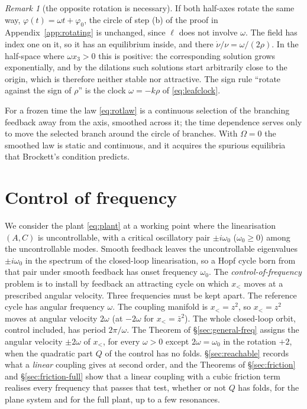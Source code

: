 \documentclass[11pt,reqno]{amsart}
\theoremstyle{plain}
\theoremstyle{definition}
\theoremstyle{remark}
\newtheorem*{remark}{Remark}
\begin{document}
\begin{remark}[the opposite rotation is necessary]
If both half-axes rotate the same way, $\varphi(t)=\omega t+\varphi_0$, the circle of step (b) of the proof in Appendix~\ref{app:rotating} is unchanged, since
$\ell$ does not involve $\omega$. The field has index one on it, so it has an equilibrium inside, and there
$\dot\nu/\nu=\omega/(2\rho)$. In the half-space where $\omega x_3>0$ this is positive: the corresponding solution
grows exponentially, and by the dilations such solutions start arbitrarily close to the origin, which is
therefore neither stable nor attractive. The sign rule ``rotate against the sign of $\rho$'' is the clock
$\omega=-k\rho$ of \eqref{eq:leafclock}.
\end{remark}
For a frozen time the law \eqref{eq:rotlaw} is a continuous selection of the branching feedback away from the
axis, smoothed across it; the time dependence serves only to move the selected branch around the circle of
branches. With $\Omega=0$ the smoothed law is static and continuous, and it acquires the spurious equilibria
that Brockett's condition predicts.


\section{Control of frequency}\label{sec:frequency}

We consider the plant \eqref{eq:plant} at a working point where the linearisation $(A,C)$ is
uncontrollable, with a critical oscillatory pair $\pm i\omega_0$ ($\omega_0\ge0$) among the
uncontrollable modes. Smooth feedback leaves the uncontrollable eigenvalues $\pm i\omega_0$ in the
spectrum of the closed-loop linearisation, so a Hopf cycle born from that pair under smooth
feedback has onset frequency $\omega_0$. The \emph{control-of-frequency} problem is to install by
feedback an attracting cycle on which $x_<$ moves at a prescribed
angular velocity. Three frequencies must be kept apart. The reference cycle has angular frequency
$\omega$. The coupling manifold is $x_<=z^{2}$, so $x_<=z^{2}$ moves at
angular velocity $2\omega$ (at $-2\omega$ for $x_<=\bar z^{2}$). The whole closed-loop orbit, control
included, has period $2\pi/\omega$. The Theorem of \S\ref{sec:general-freq} assigns the angular
velocity $\pm2\omega$ of $x_<$, for every $\omega>0$ except $2\omega=\omega_0$ in
the rotation $+2$, when the quadratic part $Q$ of the control has no folds.
\S\ref{sec:reachable} records what a \emph{linear} coupling gives at second order, and the Theorems of \S\ref{sec:friction} and \S\ref{sec:friction-full} show that a
linear coupling with a cubic friction term realises every frequency that passes that test, whether or not $Q$ has
folds, for the plane system and for the full plant, up to a few resonances.
\end{document}

